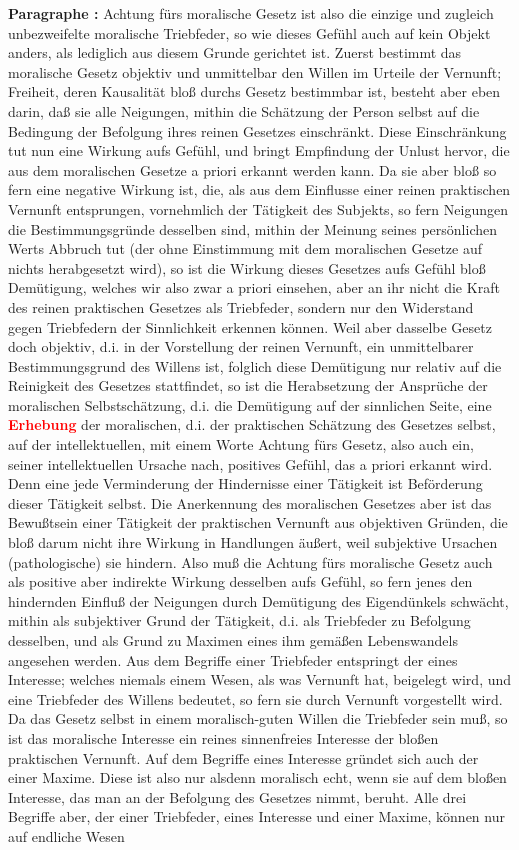 \documentclass[a4paper,12pt,twoside]{book}
\newcommand{\match}[1]{\textcolor{red}{\textbf{#1}}}
\begin{document}
	\noindent\textbf{Paragraphe : }Achtung fürs moralische Gesetz ist also die einzige und zugleich unbezweifelte moralische Triebfeder, so wie dieses Gefühl auch auf kein Objekt anders, als lediglich aus diesem Grunde gerichtet ist. Zuerst bestimmt das moralische Gesetz objektiv und unmittelbar den Willen im Urteile der Vernunft; Freiheit, deren Kausalität bloß durchs Gesetz bestimmbar ist, besteht aber eben darin, daß sie alle Neigungen, mithin die Schätzung der Person selbst auf die Bedingung der Befolgung ihres reinen Gesetzes einschränkt. Diese Einschränkung tut nun eine Wirkung aufs Gefühl, und bringt Empfindung der Unlust hervor, die aus dem moralischen Gesetze a priori erkannt werden kann. Da sie aber  bloß so fern eine negative Wirkung ist, die, als aus dem Einflusse einer reinen praktischen Vernunft entsprungen, vornehmlich der Tätigkeit des Subjekts, so fern Neigungen die Bestimmungsgründe desselben sind, mithin der Meinung seines persönlichen Werts Abbruch tut (der ohne Einstimmung mit dem moralischen Gesetze auf nichts herabgesetzt wird), so ist die Wirkung dieses Gesetzes aufs Gefühl bloß Demütigung, welches wir also zwar a priori einsehen, aber an ihr nicht die Kraft des reinen praktischen Gesetzes als Triebfeder, sondern nur den Widerstand gegen Triebfedern der Sinnlichkeit erkennen können. Weil aber dasselbe Gesetz doch objektiv, d.i. in der Vorstellung der reinen Vernunft, ein unmittelbarer Bestimmungsgrund des Willens ist, folglich diese Demütigung nur relativ auf die Reinigkeit des Gesetzes stattfindet, so ist die Herabsetzung der Ansprüche der moralischen Selbstschätzung, d.i. die Demütigung auf der sinnlichen Seite, eine \match{Erhebung} der moralischen, d.i. der praktischen Schätzung des Gesetzes selbst, auf der intellektuellen, mit einem Worte Achtung fürs Gesetz, also auch ein, seiner intellektuellen Ursache nach, positives Gefühl, das a priori erkannt wird. Denn eine jede Verminderung der Hindernisse einer Tätigkeit ist Beförderung dieser Tätigkeit selbst. Die Anerkennung des moralischen Gesetzes aber ist das Bewußtsein einer Tätigkeit der praktischen Vernunft aus objektiven Gründen, die bloß darum nicht ihre Wirkung in Handlungen äußert, weil subjektive Ursachen (pathologische) sie hindern. Also muß die Achtung fürs moralische Gesetz auch als positive aber indirekte Wirkung desselben aufs Gefühl, so fern jenes den hindernden Einfluß der Neigungen durch Demütigung des Eigendünkels schwächt, mithin als subjektiver Grund der Tätigkeit, d.i. als Triebfeder zu Befolgung desselben, und als Grund zu Maximen eines ihm gemäßen Lebenswandels angesehen werden. Aus dem Begriffe einer Triebfeder entspringt der eines Interesse; welches niemals einem Wesen, als was Vernunft hat, beigelegt wird, und eine Triebfeder des Willens bedeutet, so fern sie durch Vernunft vorgestellt wird. Da das Gesetz selbst in einem moralisch-guten Willen die Triebfeder  sein muß, so ist das moralische Interesse ein reines sinnenfreies Interesse der bloßen praktischen Vernunft. Auf dem Begriffe eines Interesse gründet sich auch der einer Maxime. Diese ist also nur alsdenn moralisch echt, wenn sie auf dem bloßen Interesse, das man an der Befolgung des Gesetzes nimmt, beruht. Alle drei Begriffe aber, der einer Triebfeder, eines Interesse und einer Maxime, können nur auf endliche Wesen 
\end{document}
